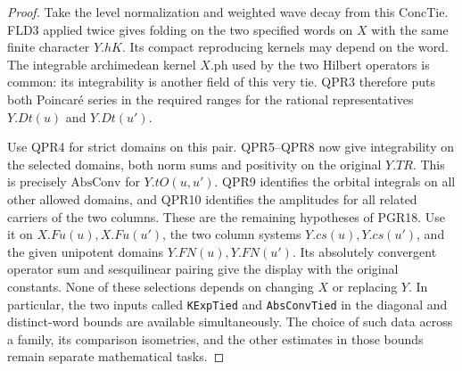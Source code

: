 \begin{proof}
Take the level normalization and weighted wave decay from this
$\mathrm{ConcTie}$. FLD3 applied twice gives folding on the two
specified words on $X$ with the same finite character $Y.hK$.
Its compact reproducing kernels may depend on the word. The
integrable archimedean kernel $X.\mathrm{ph}$ used by the two
Hilbert operators is common: its integrability is another field
of this very tie. QPR3 therefore puts both Poincar\'e series in
the required ranges for the rational representatives $Y.Dt(u)$
and $Y.Dt(u')$.

Use QPR4 for strict domains on this pair. QPR5--QPR8 now give
integrability on the selected domains, both norm sums and positivity
on the original $Y.TR$. This is precisely $\mathrm{AbsConv}$ for
$Y.tO(u,u')$. QPR9 identifies the orbital integrals on all other
allowed domains, and QPR10 identifies the amplitudes for all related
carriers of the two columns. These are the remaining hypotheses of
PGR18. Use it on $X.Fu(u),X.Fu(u')$, the two column systems
$Y.cs(u),Y.cs(u')$, and the given unipotent domains
$Y.FN(u),Y.FN(u')$. Its absolutely convergent operator sum and
sesquilinear pairing give the display with the original constants.
None of these selections depends on changing $X$ or replacing $Y$.
In particular, the two inputs called \texttt{KExpTied} and
\texttt{AbsConvTied} in the diagonal and distinct-word bounds are
available simultaneously. The choice of such data across a family,
its comparison isometries, and the other estimates in those bounds
remain separate mathematical tasks.
\end{proof}
